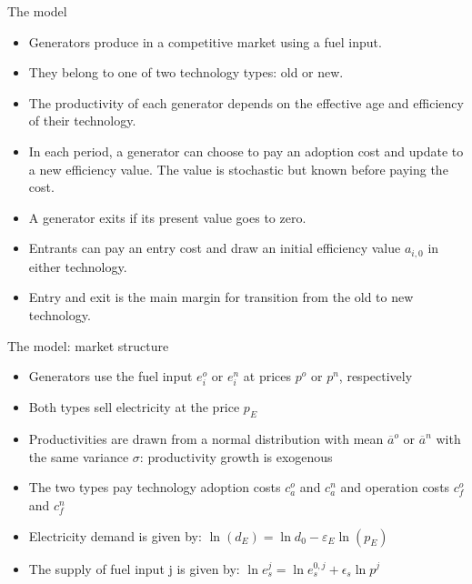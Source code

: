 \documentclass{beamer}
\begin{document}
\begin{frame}{The model}\label{model_struct}
\small
\begin{itemize}
 \item Generators produce in a competitive market using a fuel input.
 \item They belong to one of two technology types: old or new.
 \item The productivity of each generator depends on the effective age and efficiency of their technology.
 \item In each period, a generator can choose to pay an adoption cost and update to a new efficiency value. The value is stochastic but known before paying the cost. 
 \item A generator exits if its present value goes to zero.
 \item Entrants can pay an entry cost and draw an initial efficiency value $a_{i,0}$ in either technology.
 \item Entry and exit is the main margin for transition from the old to new technology.
\end{itemize}

    \hyperlink{definitions}{}  
\end{frame}
\begin{frame}{The model: market structure}
\small
\begin{itemize}
 \item Generators use the fuel input $e_i^o$ or $e_i^n$ at prices $p^o$ or $p^n$, respectively
  \item Both types sell electricity at the price $p_E$
 \item Productivities are drawn from a normal distribution with mean $\overline{a}^o$ or $\overline{a}^n$ with the same variance $\sigma$: productivity growth is exogenous
 \item The two types pay technology adoption costs $c_a^o$ and $c_a^n$ and operation costs $c_f^o$ and $c_f^n$
 \hfill \break
 \item Electricity demand is given by: $\ln(d_E) = \ln d_0-\varepsilon_E\ln(p_E)$
 \item The supply of fuel input j is given by:  $\ln e_s^j = \ln e_s^{0,j}+\epsilon_s \ln p^j$

\end{itemize}
    
\end{frame}
\end{document}
